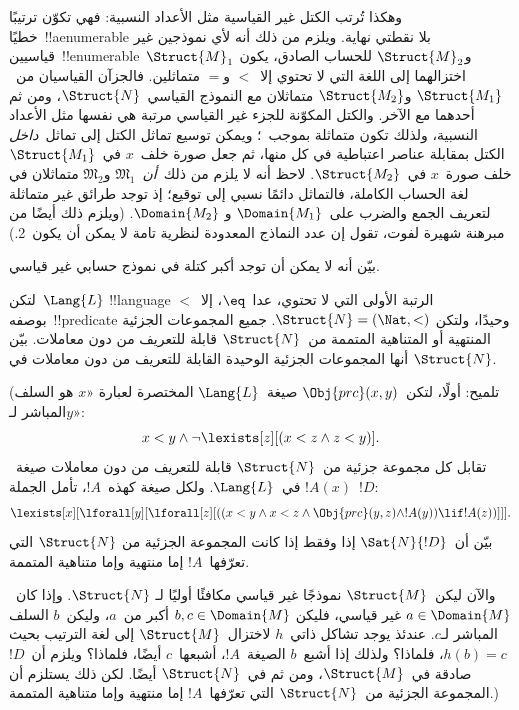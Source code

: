 \documentclass[../../../include/open-logic-section]{subfiles}
\begin{document}
وهكذا تُرتب الكتل غير القياسية مثل الأعداد النسبية: فهي تكوّن ترتيبًا
خطيًا~!!a{enumerable} بلا نقطتي نهاية. ويلزم من ذلك أنه لأي نموذجين
غير قياسيين~!!{enumerable}~$\Struct{M}_1$ و$\Struct{M}_2$ للحساب
الصادق، يكون اختزالهما إلى اللغة التي لا تحتوي إلا~$<$ و$=$ متماثلين.
فالجزآن القياسيان من~$\Struct{M_1}$ و$\Struct{M_2}$ متماثلان مع
النموذج القياسي~$\Struct{N}$، ومن ثم أحدهما مع الآخر. والكتل المكوّنة
للجزء غير القياسي مرتبة هي نفسها مثل الأعداد النسبية، ولذلك تكون
متماثلة بموجب~؛ ويمكن توسيع تماثل الكتل إلى
تماثل~\emph{داخل} الكتل بمقابلة عناصر اعتباطية في كل منها، ثم جعل
صورة خلف~$x$ في~$\Struct{M_1}$ خلف صورة~$x$ في~$\Struct{M_2}$. لاحظ
أنه لا يلزم من ذلك~\emph{أن}~$\mathfrak{M}_1$ و$\mathfrak{M}_2$
متماثلان في لغة الحساب الكاملة، فالتماثل دائمًا نسبي إلى توقيع؛ إذ
توجد طرائق غير متماثلة لتعريف الجمع والضرب على~$\Domain{M_1}$ و
$\Domain{M_2}$. (ويلزم ذلك أيضًا من مبرهنة شهيرة لفوت، تقول إن عدد
النماذج المعدودة لنظرية تامة لا يمكن أن يكون~2.)

\begin{prob}
بيّن أنه لا يمكن أن توجد أكبر كتلة في نموذج حسابي غير قياسي.
\end{prob}

\begin{prob}
لتكن~$\Lang{L}$ !!{language} الرتبة الأولى التي لا تحتوي، عدا~$\eq$،
إلا~$<$ بوصفه~!!{predicate} وحيدًا، ولتكن
$\Struct{N} = (\Nat,<)$. جميع المجموعات الجزئية المنتهية أو المتناهية
المتممة من~$\Struct{N}$ قابلة للتعريف من دون معاملات. بيّن أنها
المجموعات الجزئية الوحيدة القابلة للتعريف من دون معاملات في
$\Struct{N}$.

(تلميح: أولًا، لتكن~$\Obj{prc}(x,y)$ صيغة~$\Lang{L}$ المختصرة لعبارة
«$x$ هو السلف المباشر لـ$y$»:
\[
x<y \land \lnot \lexists[z][(x<z \land z < y)].
\]
تقابل كل مجموعة جزئية من~$\Struct{N}$ قابلة للتعريف من دون معاملات
صيغة~$!A(x)$ في~$\Lang{L}$. ولكل صيغة كهذه~$!A$، تأمل الجملة~$!D$:
\[
\lexists[x][\lforall[y][\lforall[z][((x<y \land x<z \land \Obj{prc}(y,z)
  \land !A(y)) \lif !A(z))]]].
\]
بيّن أن~$\Sat{N}{!D}$ إذا وفقط إذا كانت المجموعة الجزئية من
$\Struct{N}$ التي تعرّفها~$!A$ إما منتهية وإما متناهية المتممة.

والآن ليكن~$\Struct{M}$ نموذجًا غير قياسي مكافئًا أوليًا لـ
$\Struct{N}$. وإذا كان~$a \in \Domain{M}$ غير قياسي، فليكن
$b, c \in \Domain{M}$ أكبر من~$a$، وليكن~$b$ السلف المباشر لـ$c$.
عندئذ يوجد تشاكل ذاتي~$h$ لاختزال~$\Struct{M}$ إلى لغة الترتيب بحيث
$h(b)=c$، فلماذا؟ ولذلك إذا أشبع~$b$ الصيغة~$!A$، أشبعها~$c$ أيضًا،
فلماذا؟ ويلزم أن~$!D$ صادقة في~$\Struct{M}$، ومن ثم في~$\Struct{N}$
أيضًا. لكن ذلك يستلزم أن المجموعة الجزئية من~$\Struct{N}$ التي
تعرّفها~$!A$ إما منتهية وإما متناهية المتممة.)
\end{prob}
\end{document}

